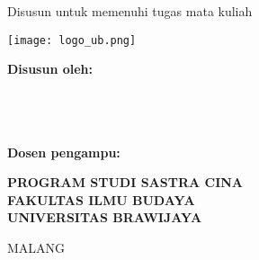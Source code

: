 \begin{titlepage}

    \begin{center}
        \MakeUppercase{\textbf{\thetitle}}

        Disusun untuk memenuhi tugas mata kuliah \matkul

        \vfill
        \texttt{[image: logo\_ub.png]}
        \vfill

        \textbf{Disusun oleh:}\\
        \theauthor\\
        \matkul\\
        \nim\\
        \kelas

        \textbf{Dosen pengampu:} \dosen
        \vfill

        \bfseries
        PROGRAM STUDI SASTRA CINA\\
        FAKULTAS ILMU BUDAYA\\
        UNIVERSITAS BRAWIJAYA
        \vspace{1em}

        MALANG\\
        \the\year{}
    \end{center}

\end{titlepage}

